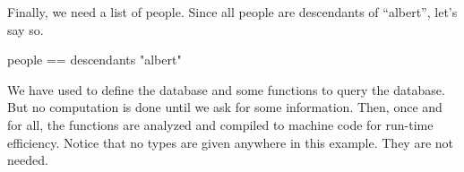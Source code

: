\begin{xtc}
\begin{xtccomment}
Finally, we need a list of people.
Since all people are descendants of ``albert'', let's say so.
\end{xtccomment}
\begin{spadsrc}
people == descendants "albert"
\end{spadsrc}
\end{xtc}

We have used \spadSyntax{==} to define the database and some functions to
query the database.
But no computation is done until we ask for some information.
Then, once and for all, the functions are analyzed and compiled to machine
code for run-time efficiency.
Notice that no types are given anywhere in this example.
They are not needed.

